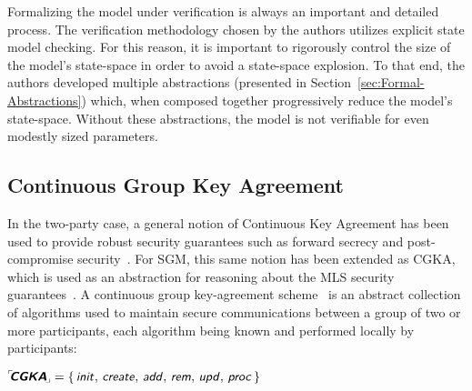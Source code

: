 \documentclass[authordraft,sigconf]{acmart}
\newcommand{\Abrev}[1]{\gls{#1}}
\begin{document}
Formalizing the model under verification is always an important and detailed process.
The verification methodology chosen by the authors utilizes explicit state model checking.
For this reason, it is important to rigorously control the size of the model's state-space in order to avoid a state-space explosion. 
To that end, the authors developed multiple abstractions (presented in Section~\ref{sec:Formal-Abstractions}) which, when composed together progressively reduce the model's state-space. 
Without these abstractions, the model is not verifiable for even modestly sized parameters.

\subsection{Continuous Group Key Agreement}
In the two-party case, a general notion of Continuous Key Agreement has been used to provide robust security guarantees such as forward secrecy and post-compromise security~\cite{perrin2013axolotl, perrin2016double, alwen2019double}.
For \Abrev{SGM}, this same notion has been extended as \Abrev{CGKA}, which is used as an abstraction for reasoning about the \Abrev{MLS} security guarantees~\cite{alwen2020security}.
A continuous group key-agreement scheme \CGKAdef\ is an abstract collection of algorithms used to maintain secure communications between a group of two or more participants, each algorithm being known and performed locally by participants:\\[2mm]
\centerline{${}^{\ulcorner}\!\!\textbf{\textsf{\textsl{CGKA}}}_{\!\lrcorner} = \left\{\,\text{\sffamily{\textsl{init}}},\, \text{\sffamily{\textsl{create}}},\, \text{\sffamily{\textsl{add}}},\, \text{\sffamily{\textsl{rem}}},\, \text{\sffamily{\textsl{upd}}},\, \text{\sffamily{\textsl{proc}}}\,\right\}$}\\[-3mm]
\end{document}
